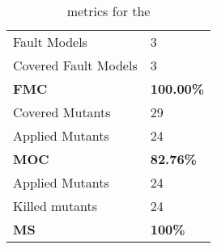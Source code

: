 
\begin{table}[H]

\begin{tabular}{|l|l|}
\hline
Fault Models & 3 \\
Covered Fault Models & 3 \\
\hline
\textbf{FMC} & \textbf{100.00\%} \\
\hline
Covered Mutants & 29 \\
Applied Mutants & 24 \\
\hline
\textbf{MOC} & \textbf{82.76\%} \\
\hline
Applied Mutants & 24 \\
Killed mutants & 24 \\
\hline
\textbf{MS} & \textbf{100\%} \\
\hline
\end{tabular}
\caption{\DAMA metrics for the \case}
\label{tab:metrics}
\end{table}
